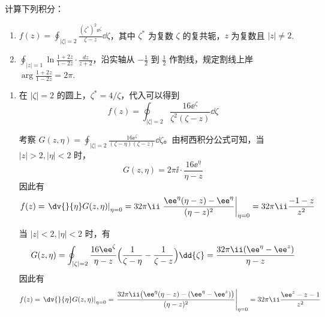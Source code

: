 
\begin{question}
计算下列积分：

\begin{enumerate}
  \item \(\displaystyle f(z)=\oint_{|\zeta|=2} \frac{(\zeta^*)^2 \ee^{\zeta}}{\zeta-z} \dd{\zeta}\)，其中 \(\zeta^*\) 为复数 \(\zeta\) 的复共轭，\(z\) 为复数且 \(|z|\neq2\).

  \item \(\displaystyle \oint_{|z|=1} \ln\frac{1+2z}{1-2z} \cdot \frac{dz}{z+2}\)，沿实轴从 \(\displaystyle -\frac12\) 到 \(\displaystyle \frac12\) 作割线，规定割线上岸 \(\displaystyle \arg\frac{1+2z}{1-2z}=2\pi\).

\begin{center}
\end{center}

\end{enumerate}
\begin{solution}
\begin{enumerate}
  \item 在 \(|\zeta|=2\) 的圆上，\(\zeta^*=4/\zeta\)，代入可以得到
\[ f(z)=\oint_{|\zeta|=2} \frac{16\ee^{\zeta}}{\zeta^2(\zeta-z)}\dd{\zeta} \]

 考察 \(G(z,\eta)=\displaystyle\oint_{|\zeta|=2} \frac{16\ee^{\zeta}}{(\zeta-\eta)(\zeta-z)}\dd{\zeta}\)。由柯西积分公式可知，当 \(|z|>2,|\eta|<2\) 时，
\[ G(z,\eta)=2\pi\ii \cdot \frac{16\ee^{\eta}}{\eta-z} \]
因此有
\[ f(z)=\left.\dv{}{\eta}G(z,\eta)\right|_{\eta=0}=32\pi\ii \left.\frac{\ee^{\eta}(\eta-z)-\ee^{\eta}}{(\eta-z)^2}\right|_{\eta=0}=32\pi\ii\frac{-1-z}{z^2} \]

当 \(|z|<2,|\eta|<2\) 时，有
 \[ G(z,\eta)=\oint_{|\zeta|=2}\frac{16\ee^{\zeta}}{\eta-z}\Bigl(\frac1{\zeta-\eta}-\frac1{\zeta-z}\Bigr)\dd{\zeta}=\frac{32\pi\ii(\ee^{\eta}-\ee^{z})}{\eta-z} \]
因此有
\[ f(z)=\left.\dv{}{\eta}G(z,\eta)\right|_{\eta=0}=\left.\frac{32\pi\ii\bigl(\ee^{\eta}(\eta-z)-(\ee^{\eta}-\ee^{z})\bigr)}{(\eta-z)^2}\right|_{\eta=0}=32\pi\ii\frac{\ee^{z}-z-1}{z^2} \]


\end{enumerate}
\end{solution}
\end{question}
